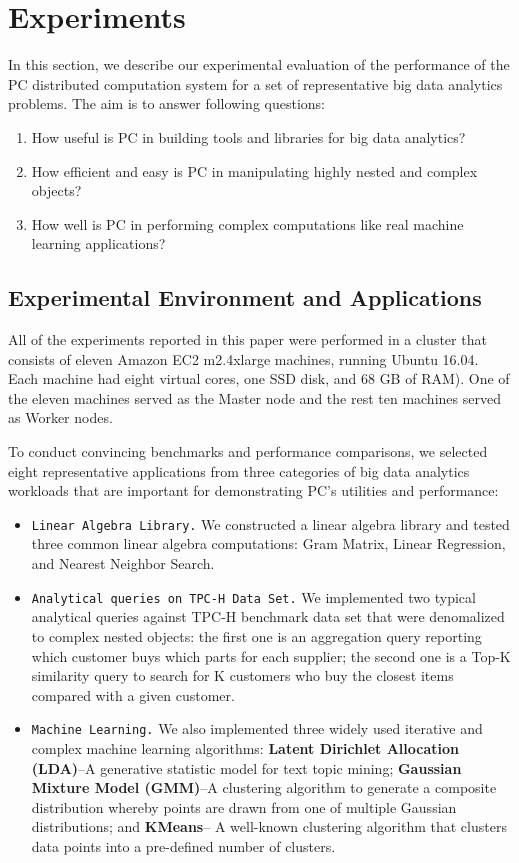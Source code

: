 
\section{Experiments}

In this section, we describe our experimental evaluation of the
performance of the PC distributed computation system for a set of
representative big data analytics problems. The aim is to answer
following questions:

\begin {enumerate}
\item How useful is PC in building tools and libraries for big data analytics?
\item How efficient and easy is PC in manipulating highly nested and complex objects?
\item How well is PC in performing complex computations like real
  machine learning applications?
\end {enumerate}

\subsection {Experimental Environment and Applications}

All of the experiments reported in this paper were performed in a
cluster that consists of eleven Amazon EC2 m2.4xlarge machines,
running Ubuntu 16.04. Each machine had eight virtual cores, one SSD
disk, and 68 GB of RAM). One of the eleven machines served as the Master
node and the rest ten machines served as Worker nodes.

\vspace{5pt}
To conduct convincing benchmarks and performance comparisons, we
selected eight representative applications from three categories
of big data analytics workloads that are important for demonstrating
PC's utilities and performance:

\begin {itemize}
\item \texttt{Linear Algebra Library.} We constructed a linear algebra library
  and tested three common linear algebra computations: Gram Matrix,
  Linear Regression, and Nearest Neighbor Search.
\item \texttt{Analytical queries on TPC-H Data
    Set.}  We implemented two typical analytical queries against TPC-H
  benchmark data set that were denomalized to complex nested objects: the first one is an aggregation query reporting which customer buys which
  parts for each supplier; the second one is a Top-K similarity query
  to search for K customers who buy the closest items compared with a
  given customer.
\item \texttt{Machine Learning.} We also implemented three widely used
  iterative and complex machine learning algorithms: \textbf{Latent Dirichlet Allocation (LDA)}--A
  generative statistic model for text topic mining;
  \textbf{Gaussian Mixture Model (GMM)}--A clustering algorithm to generate a composite
  distribution whereby points are drawn from one of multiple Gaussian distributions;  and \textbf{KMeans}-- A well-known clustering algorithm that clusters
  data points into a pre-defined number of clusters.
\end {itemize}

